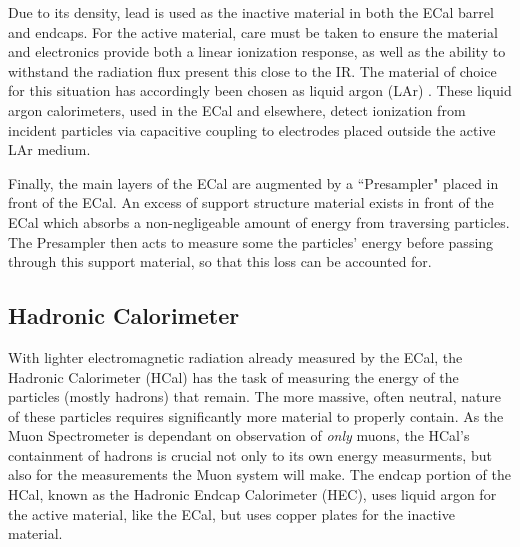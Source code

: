         Due to its density, lead is used as the inactive material in both the ECal barrel and endcaps.
        For the active material, care must be taken to ensure the material and electronics provide both a linear ionization response, as well as the ability to withstand the radiation flux present this close to the IR.
        The material of choice for this situation has accordingly been chosen as liquid argon (LAr) \cite{Lar_cal_tdr}.
        These liquid argon calorimeters, used in the ECal and elsewhere, detect ionization from incident particles via capacitive coupling to electrodes placed outside the active LAr medium.

        Finally, the main layers of the ECal are augmented by a ``Presampler" placed in front of the ECal.
        An excess of support structure material exists in front of the ECal which absorbs a non-negligeable amount of energy from traversing particles.
        The Presampler then acts to measure some the particles' energy before passing through this support material, so that this loss can be accounted for.

    \subsection{Hadronic Calorimeter}
        With lighter electromagnetic radiation already measured by the ECal, the Hadronic Calorimeter (HCal) has the task of measuring the energy of the particles (mostly hadrons) that remain.
        The more massive, often neutral, nature of these particles requires significantly more material to properly contain.
        As the Muon Spectrometer is dependant on observation of \textit{only} muons, the HCal's containment of hadrons is crucial not only to its own energy measurments, but also for the measurements the Muon system will make.
        The endcap portion of the HCal, known as the Hadronic Endcap Calorimeter (HEC), uses liquid argon for the active material, like the ECal, but uses copper plates for the inactive material.

